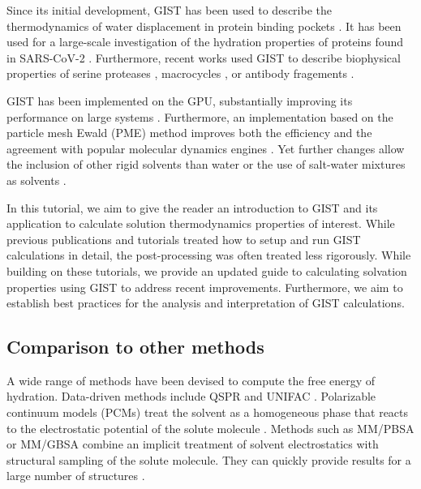 \documentclass[9pt,tutorial]{livecoms}
\begin{document}
Since its initial development, GIST has been used to describe the thermodynamics of water displacement in protein binding pockets \cite{Nguyen2016-gist-second-order,Ramsey2016,Balius2017-gist-ligand-discovery,Hufner-Wulsdorf2020-gist-drug-design}.
It has been used for a large-scale investigation of the hydration properties of proteins found in SARS-CoV-2 \cite{Olson2020-covid-gist}.
Furthermore, recent works used GIST to describe biophysical properties of serine proteases \cite{Kraml2019-gigist}, macrocycles \cite{Kamenik2020-gist-macrocycles}, or antibody fragements \cite{Waibl2021-gist-antibodies}.

GIST has been implemented on the GPU, substantially improving its performance on large systems \cite{Kraml2019-gigist}.
Furthermore, an implementation based on the particle mesh Ewald (PME) \cite{Darden1993-pme} method improves both the efficiency and the agreement with popular molecular dynamics engines \cite{Chen2021}. 
Yet further changes allow the inclusion of other rigid solvents than water \cite{Kraml2020,Waibl2022-gist-solvents} or the use of salt-water mixtures as solvents \cite{Waibl2021-gist-salt}.

In this tutorial, we aim to give the reader an introduction to GIST and its application to calculate solution thermodynamics properties of interest. 
While previous publications \cite{Ramsey2016} and tutorials \cite{amber_tut_gist} treated how to setup and run GIST calculations in detail, the post-processing was often treated less rigorously. While building on these tutorials, we provide an updated guide to calculating solvation properties using GIST to address recent improvements.
Furthermore, we aim to establish best practices for the analysis and interpretation of GIST calculations.

\subsection{Comparison to other methods}
A wide range of methods have been devised to compute the free energy of hydration.
Data-driven methods include QSPR and UNIFAC \cite{Borhani2019-qspr,Fredenslund1975-unifac}.
Polarizable continuum models (PCMs) \cite{Miertus1981-pcm,Klamt1993-cosmo} treat the solvent as a homogeneous phase that reacts to the electrostatic potential of the solute molecule \cite{Mennucci2010-pcm}.
Methods such as MM/PBSA or MM/GBSA \cite{Sitkoff1994-pbsa,Kollman2000-mmpbsa} combine an implicit treatment of solvent electrostatics with structural sampling of the solute molecule.
They can quickly provide results for a large number of structures \cite{Genheden2015-mmpbsa-review}.
\end{document}
